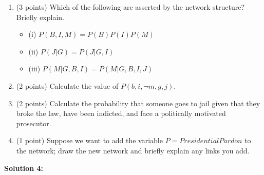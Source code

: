 \documentclass[]{article}
\begin{document}
\begin{enumerate}[label=(\alph*)]
    \item (3 points) Which of the following are asserted by the network structure? Briefly explain.
    
    \begin{itemize}
        \item[] (i) $P(B,I,M) = P(B)P(I)P(M)$
        \item[] (ii) $P(J | G) = P(J | G, I)$
        \item[] (iii) $P(M | G, B, I) = P(M | G, B, I, J)$
    \end{itemize}
    
    \item (2 points) Calculate the value of $P(b, i, \neg m, g, j)$.
    \item (2 points) Calculate the probability that someone goes to jail given that they broke the law, have been indicted, and face a politically motivated prosecutor.
    \item (1 point) Suppose we want to add the variable $P = PresidentialPardon$ to the network; draw the new network and briefly explain any links you add.

\end{enumerate}

\bigskip

\textbf{Solution 4:}
\end{document}
